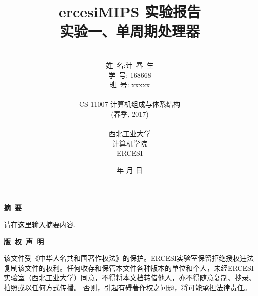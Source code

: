 \documentclass[a4paper]{article}
\begin{document}
\renewcommand{\contentsname}{目\ 录}
\renewcommand{\appendixname}{附录}
\renewcommand{\appendixpagename}{附录}
\renewcommand{\refname}{参考文献} 
\renewcommand{\figurename}{图}
\renewcommand{\tablename}{表}
\renewcommand{\today}{\number\year 年 \number\month 月 \number\day 日}

\title{{\Huge ercesiMIPS 实验报告{\large\linebreak\\}}{\Large 实验一、单周期处理器\linebreak\linebreak}}
\author{\\姓\ 名:计\ 春\ 生\\
学\ 号: 168668\\
班\ 号: xxxxx\\\\
CS 11007 计算机组成与体系结构\\
(春季, 2017)\\\\
西北工业大学\\
计算机学院\\
ERCESI}
\date{\today}
\maketitle
\newpage

\begin{center}
{\Large\bf{摘\ 要\\}}
\end{center}
请在这里输入摘要内容.
\newpage
\begin{center}
{\Large\bf{版\ 权\ 声\ 明\\}}
\end{center}
该文件受《中华人名共和国著作权法》的保护。ERCESI实验室保留拒绝授权违法复制该文件的权利。任何收存和保管本文件各种版本的单位和个人，未经ERCESI实验室（西北工业大学）同意，不得将本文档转借他人，亦不得随意复制、抄录、拍照或以任何方式传播。 否则，引起有碍著作权之问题，将可能承担法律责任。\newpage
\begin{center}
\tableofcontents\label{c}
\end{center}
\newpage

\end{document}
